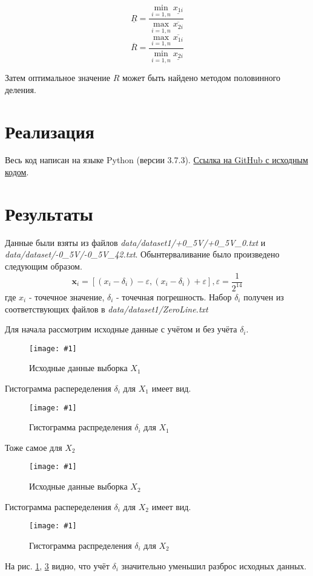 \documentclass[a4paper,12pt]{article}
\newcommand{\plot}[3]{
    \begin{figure}[H]
        \begin{center}
            \texttt{[image: \#1]}
            \caption{#2}
            \label{#3}
        \end{center}
    \end{figure}
}
\begin{document}
    \begin{equation}
        \underline{R} = \frac{\min_{i=1,n}\underline{x_{1i}}}{\max_{i=1,n}\overline{x_{2i}}}
        \label{e:outerRMin}
    \end{equation}
    \begin{equation}
        \overline{R} = \frac{\max_{i=1,n}\overline{x_{1i}}}{\min_{i=1,n}\underline{x_{2i}}}
        \label{e:outerRMax}
    \end{equation}

    Затем оптимальное значение $ R $ может быть найдено методом половинного деления.

    \section{Реализация}
    \quad Весь код написан на языке Python (версии 3.7.3).
    \href{https://github.com/kirillkuks/Intervals/tree/master/lab1}{Ссылка на GitHub с исходным кодом}.

    \section{Результаты}
    \quad Данные были взяты из файлов \textsl{data/dataset1/+0\_5V/+0\_5V\_0.txt} и \textsl{data/dataset/-0\_5V/-0\_5V\_42.txt}.
    Обынтерваливание было произведено следующим образом.
    \begin{equation}
        \textbf{x}_i = [(x_i - \delta_i) - \varepsilon, (x_i - \delta_i) + \varepsilon], \varepsilon = \frac{1}{2^{14}}
    \end{equation}
    где $ x_i $ - точечное значение, $ \delta_i $ - точечная погрешность.
    Набор $ \delta_i $ получен из соответствующих файлов в \textsl{data/dataset1/ZeroLine.txt}

    Для начала рассмотрим исходные данные с учётом и без учёта $ \delta_i $.
    \plot{FixedDataX1}{Исходные данные выборка $ X_1 $}{p:rawSampleX1}
    Гистограмма распеределения $ \delta_i $ для $ X_1 $ имеет вид.
    \plot{DeltasHistX1}{Гистограмма распределения $ \delta_i $ для $ X_1 $}{p:deltasHistX1}

    Тоже самое для $ X_2 $
    \plot{FixedDataX2}{Исходные данные выборка $ X_2 $}{p:rawSampleX2}
    Гистограмма распеределения $ \delta_i $ для $ X_2 $ имеет вид.
    \plot{DeltasHistX2}{Гистограмма распределения $ \delta_i $ для $ X_2 $}{p:deltasHistX2}

    На рис. \ref{p:rawSampleX1}, \ref{p:rawSampleX2} видно, что учёт $ \delta_i $ значительно
    уменьшил разброс исходных данных.
    
\end{document}
